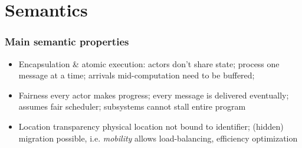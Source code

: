 \section{Semantics}
\begin{frame}
\frametitle{Main semantic properties}
\begin{itemize}
	\item Encapsulation \& atomic execution:	
	actors don't share state; 
	process one message at a time; 
	arrivals mid-computation need to be buffered;
	\item Fairness
	every actor makes progress; 
	every message is delivered eventually; 
	assumes fair scheduler; 
	\textrightarrow subsystems cannot stall entire program
	\item Location transparency
	physical location not bound to identifier;
	\textrightarrow (hidden) migration possible, i.e. {\it mobility}
	\textrightarrow allows load-balancing, efficiency optimization
\end{itemize}
\end{frame}

